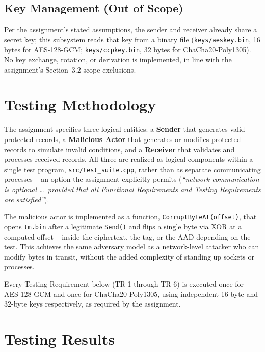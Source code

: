 \documentclass[11pt]{article}
\begin{document}
\subsection{Key Management (Out of Scope)}

Per the assignment's stated assumptions, the sender and receiver already share a
secret key; this subsystem reads that key from a binary file
(\texttt{keys/aeskey.bin}, 16 bytes for AES-128-GCM; \texttt{keys/ccpkey.bin}, 32 bytes
for ChaCha20-Poly1305). No key exchange, rotation, or derivation is implemented, in
line with the assignment's Section~3.2 scope exclusions.

\section{Testing Methodology}

The assignment specifies three logical entities: a \textbf{Sender} that generates
valid protected records, a \textbf{Malicious Actor} that generates or modifies
protected records to simulate invalid conditions, and a \textbf{Receiver} that
validates and processes received records. All three are realized as logical
components within a single test program, \texttt{src/test\_suite.cpp}, rather than as
separate communicating processes -- an option the assignment explicitly permits
(\emph{``network communication is optional \dots\ provided that all Functional
Requirements and Testing Requirements are satisfied''}).

The malicious actor is implemented as a function, \texttt{CorruptByteAt(offset)}, that
opens \texttt{tm.bin} after a legitimate \texttt{Send()} and flips a single byte via
XOR at a computed offset -- inside the ciphertext, the tag, or the AAD depending on the
test. This achieves the same adversary model as a network-level attacker who can
modify bytes in transit, without the added complexity of standing up sockets or
processes.

Every Testing Requirement below (TR-1 through TR-6) is executed once for AES-128-GCM
and once for ChaCha20-Poly1305, using independent 16-byte and 32-byte keys
respectively, as required by the assignment.

\section{Testing Results}
\end{document}
